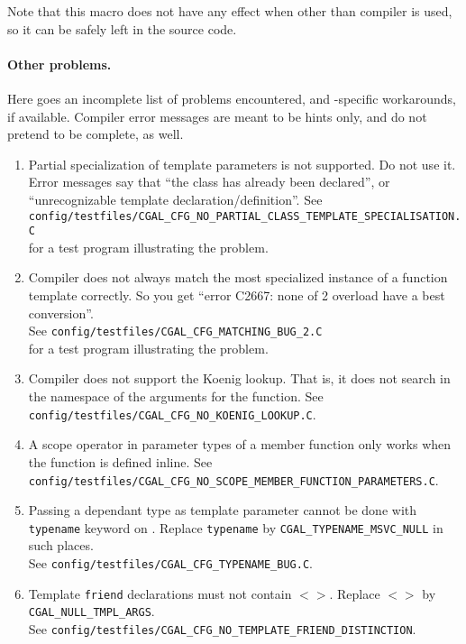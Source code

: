 Note that this macro does not have any effect when other than
 compiler is used, so it can be safely left in the source code. 
\medskip

\paragraph{Other problems.} Here goes an incomplete list
of problems encountered, and \cgal-specific workarounds, if
available. 
Compiler error messages are meant to be
hints only, and do not pretend to be complete, as well.
\begin{enumerate}
%
\item Partial specialization of template parameters is not
supported. Do not use it. Error messages say that ``the class has
already been declared'', or ``unrecognizable template
declaration/definition''. See
\texttt{config/testfiles/CGAL\_CFG\_NO\_PARTIAL\_CLASS\_TEMPLATE\_SPECIALISATION.C}\\
 for a test program illustrating the problem. \label{msvc::parspec}
%
\item Compiler does not always match the most
specialized instance of a function template correctly. So you get
``error C2667: none of 2 overload have a best conversion''.\\
See \texttt{config/testfiles/CGAL\_CFG\_MATCHING\_BUG\_2.C} \\
for a test program illustrating the problem.\label{msvc::matchbug2}
%
\item Compiler does not support the Koenig
lookup. That is, it does not search in the namespace of the arguments for
the function. See
\texttt{config/testfiles/CGAL\_CFG\_NO\_KOENIG\_LOOKUP.C}. \label{msvc::koenig}
%
\item A scope operator in  parameter types of a member function only
works when the function is defined inline. See
\texttt{config/testfiles/CGAL\_CFG\_NO\_SCOPE\_MEMBER\_FUNCTION\_PARAMETERS.C}. 
\label{msvc::scopememberfunc}
%
\item Passing a dependant type as template parameter cannot be done
with \texttt{typename} keyword on \msvc. Replace \texttt{typename}
by \texttt{CGAL\_TYPENAME\_MSVC\_NULL} in such places.\\ 
See \texttt{config/testfiles/CGAL\_CFG\_TYPENAME\_BUG.C}. \label{msvc::typename}
%
\item Template \texttt{friend} declarations must not contain $<>$.
Replace $<>$  by \texttt{CGAL\_NULL\_TMPL\_ARGS}.\\
See \texttt{config/testfiles/CGAL\_CFG\_NO\_TEMPLATE\_FRIEND\_DISTINCTION}.

\end{enumerate}
